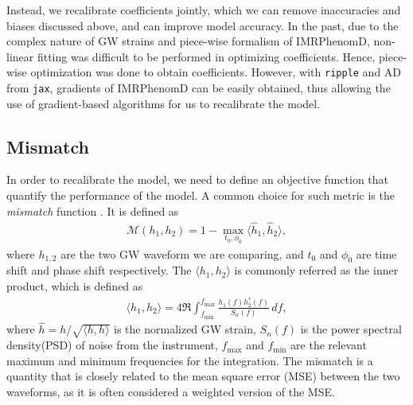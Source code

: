 \documentclass[twocolumn]{aastex631}
\newcommand{\ripple}{\texttt{ripple}}
\newcommand{\jax}{\texttt{jax}}
\begin{document}

Instead, we recalibrate coefficients jointly, which we can remove inaccuracies
and biases discussed above, and can improve model accuracy. In the past, due to
the complex nature of GW strains and piece-wise formalism of IMRPhenomD,
non-linear fitting was difficult to be performed in optimizing coefficients.
Hence, piece-wise optimization was done to obtain coefficients. However, with
{\ripple} and AD from \jax, gradients of IMRPhenomD can be easily obtained, thus
allowing the use of gradient-based algorithms for us to recalibrate the model.   

\subsection{Mismatch} \label{subsec:mismatch}

In order to recalibrate the model, we need to define an objective function that
quantify the performance of the model. A common choice for such metric is the
\textit{mismatch} function \citep{husa2016frequency}. It is defined as
\begin{align} \label{eq:mismatch}
	\mathcal{M}(h_1, h_2)=1-\max_{t_0, \phi_0}\langle \hat{h}_1, \hat{h}_2\rangle,
\end{align}
where $h_{1,2}$ are the two GW waveform we are comparing, and $t_0$ and $\phi_0$
are time shift and phase shift respectively. The $\langle h_1, h_2 \rangle$ is
commonly referred as the inner product, which is defined as 
\begin{align}\label{eq:inner_prod}
	\langle h_1, h_2 \rangle = 4\Re\int_{f_{\mathrm{min}}}^{f_{\mathrm{max}}}\frac{h_1(f)h_2^{\ast}(f)}{S_n(f)}\,df,
\end{align}
where $\hat{h}=h/\sqrt{\langle h, h \rangle}$ is the normalized GW strain,
$S_n(f)$ is the power spectral density(PSD) of noise from the instrument, $f_{\mathrm{max}}$ and $f_{\mathrm{min}}$ are
the relevant maximum and minimum frequencies for the integration. The mismatch
is a quantity that is closely related to the mean square error (MSE) between the
two waveforms, as it is often considered a weighted version of the MSE.
\end{document}
